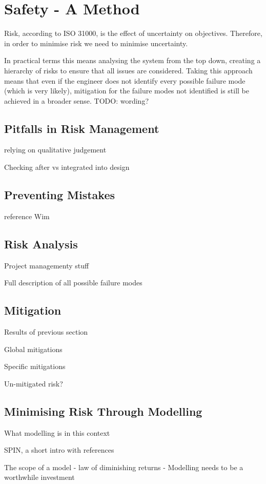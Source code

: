 \section{Safety - A Method}
Risk, according to ISO 31000\cite{ISO31000}, is the effect of uncertainty on objectives. 
Therefore, in order to minimise risk we need to minimise uncertainty.

In practical terms this means analysing the system from the top down,
creating a hierarchy of risks to ensure that all issues are considered. 
Taking this approach means that even if the engineer does not identify
every possible failure mode (which is very likely), mitigation for the
failure modes not identified is still be achieved in a broader sense. TODO: wording?

\subsection{Pitfalls in Risk Management}
relying on qualitative judgement

Checking after vs integrated into design

\subsection{Preventing Mistakes}
reference Wim

\subsection{Risk Analysis}


Project managementy stuff

 Full description of all possible failure modes

\subsection{Mitigation}
Results of previous section

Global mitigations

Specific mitigations

Un-mitigated risk?

\subsection{Minimising Risk Through Modelling}
What modelling is in this context

SPIN, a short intro with references

The scope of a model - law of diminishing returns - Modelling needs to be a worthwhile investment

